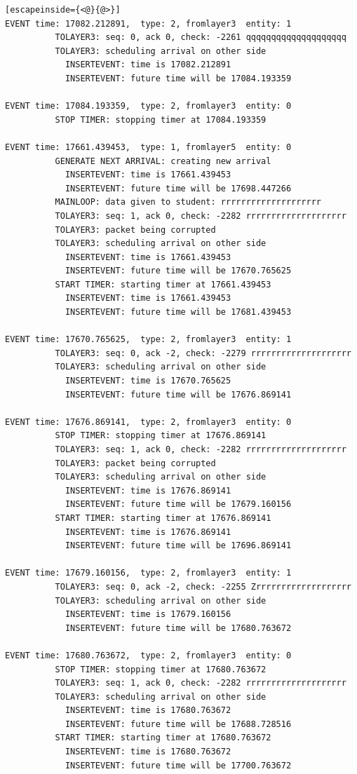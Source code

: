 \documentclass[paper=a4, fontsize=11pt]{scrartcl}
\numberwithin{equation}{section}		%
\numberwithin{figure}{section}			%
\numberwithin{table}{section}				%
\begin{document}
\begin{lstlisting}[escapeinside={<@}{@>}]
EVENT time: 17082.212891,  type: 2, fromlayer3  entity: 1
          TOLAYER3: seq: 0, ack 0, check: -2261 qqqqqqqqqqqqqqqqqqqq
          TOLAYER3: scheduling arrival on other side
            INSERTEVENT: time is 17082.212891
            INSERTEVENT: future time will be 17084.193359

EVENT time: 17084.193359,  type: 2, fromlayer3  entity: 0
          STOP TIMER: stopping timer at 17084.193359

EVENT time: 17661.439453,  type: 1, fromlayer5  entity: 0
          GENERATE NEXT ARRIVAL: creating new arrival
            INSERTEVENT: time is 17661.439453
            INSERTEVENT: future time will be 17698.447266
          MAINLOOP: data given to student: rrrrrrrrrrrrrrrrrrrr
          TOLAYER3: seq: 1, ack 0, check: -2282 rrrrrrrrrrrrrrrrrrrr
          TOLAYER3: packet being corrupted
          TOLAYER3: scheduling arrival on other side
            INSERTEVENT: time is 17661.439453
            INSERTEVENT: future time will be 17670.765625
          START TIMER: starting timer at 17661.439453
            INSERTEVENT: time is 17661.439453
            INSERTEVENT: future time will be 17681.439453

EVENT time: 17670.765625,  type: 2, fromlayer3  entity: 1
          TOLAYER3: seq: 0, ack -2, check: -2279 rrrrrrrrrrrrrrrrrrrr
          TOLAYER3: scheduling arrival on other side
            INSERTEVENT: time is 17670.765625
            INSERTEVENT: future time will be 17676.869141

EVENT time: 17676.869141,  type: 2, fromlayer3  entity: 0
          STOP TIMER: stopping timer at 17676.869141
          TOLAYER3: seq: 1, ack 0, check: -2282 rrrrrrrrrrrrrrrrrrrr
          TOLAYER3: packet being corrupted
          TOLAYER3: scheduling arrival on other side
            INSERTEVENT: time is 17676.869141
            INSERTEVENT: future time will be 17679.160156
          START TIMER: starting timer at 17676.869141
            INSERTEVENT: time is 17676.869141
            INSERTEVENT: future time will be 17696.869141

EVENT time: 17679.160156,  type: 2, fromlayer3  entity: 1
          TOLAYER3: seq: 0, ack -2, check: -2255 Zrrrrrrrrrrrrrrrrrrr
          TOLAYER3: scheduling arrival on other side
            INSERTEVENT: time is 17679.160156
            INSERTEVENT: future time will be 17680.763672

EVENT time: 17680.763672,  type: 2, fromlayer3  entity: 0
          STOP TIMER: stopping timer at 17680.763672
          TOLAYER3: seq: 1, ack 0, check: -2282 rrrrrrrrrrrrrrrrrrrr
          TOLAYER3: scheduling arrival on other side
            INSERTEVENT: time is 17680.763672
            INSERTEVENT: future time will be 17688.728516
          START TIMER: starting timer at 17680.763672
            INSERTEVENT: time is 17680.763672
            INSERTEVENT: future time will be 17700.763672


\end{lstlisting}
\end{document}
